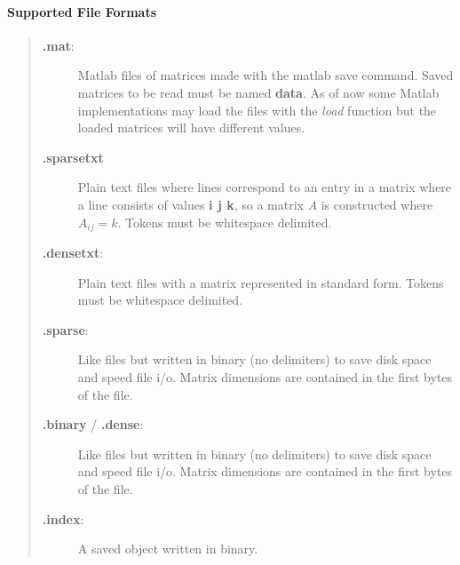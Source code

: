 \documentclass[letterpaper,10pt,english]{sphinxmanual}
\begin{document}
\paragraph{Supported File Formats}
\label{loader_tutorial:supported-file-formats}\begin{quote}
\begin{description}
\item[{\textbf{.mat}:}] \leavevmode
Matlab files of matrices made with the matlab save command. Saved matrices to be read must be named \textbf{data}. As of
now some Matlab implementations may load the files with the \emph{load} function but the loaded matrices will have different values.

\item[{\textbf{.sparsetxt}}] \leavevmode
Plain text files where lines correspond to an entry in a matrix where a line consists of values \textbf{i j k}, so a matrix \emph{A} is constructed where  \(A_{ij} = k\). Tokens must be whitespace delimited.

\item[{\textbf{.densetxt}:}] \leavevmode
Plain text files with a matrix represented in standard form. Tokens must be whitespace delimited.

\item[{\textbf{.sparse}:}] \leavevmode
Like  files but written in binary (no delimiters) to save disk space and speed file i/o. Matrix dimensions are contained in the first bytes of the file.

\item[{\textbf{.binary} / \textbf{.dense}:}] \leavevmode
Like  files but written in binary (no delimiters) to save disk space and speed file i/o. Matrix dimensions are contained in the first bytes of the file.

\item[{\textbf{.index}:}] \leavevmode
A saved {\hyperref[loader:loader.HotIndex]{\emph{}}} object written in binary.

\end{description}
\end{quote}
\end{document}

